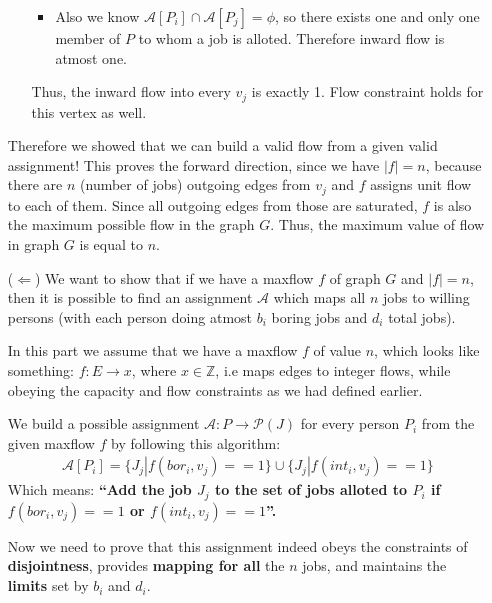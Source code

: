 \documentclass[11pt, fleqn]{article}
\begin{document}
\begin{itemize}
\begin{itemize}
\begin{itemize}
            \item Also we know $\mathcal{A}[P_i] \cap \mathcal{A}[P_j] = \phi$, so there exists one and only one member of $P$ to whom a job is alloted. Therefore inward flow is atmost one.
        \end{itemize}
        Thus, the inward flow into every $v_j$ is exactly 1. Flow constraint holds for this vertex as well.
    \end{itemize}
    
    Therefore we showed that we can build a valid flow from a given valid assignment! This proves the forward direction, since we have $|f|=n$, because there are $n$ (number of jobs) outgoing edges from $v_j$ and $f$ assigns unit flow to each of them. Since all outgoing edges from those are saturated, $f$ is also the maximum possible flow in the graph $G$. Thus, the maximum value of flow in graph $G$ is equal to $n$.
    
    \item[($\Leftarrow$)] We want to show that if we have a maxflow $f$ of graph $G$ and $|f|=n$, then it is possible to find an assignment $\mathcal{A}$ which maps all $n$ jobs to willing persons (with each person doing atmost $b_i$ boring jobs and $d_i$ total jobs).
    
    In this part we assume that we have a maxflow $f$ of value $n$, which looks like something: $f: E \longrightarrow x$, where $x \in \mathbb{Z}$, i.e maps edges to integer flows, while obeying the capacity and flow constraints as we had defined earlier.
    
    We build a possible assignment $\mathcal{A}: P \longrightarrow \mathcal{P}(J)$ for every person $P_i$ from the given maxflow $f$ by following this algorithm:
    \begin{equation*}
        \begin{gathered}
            \mathcal{A}[P_i] = \{J_j | f(bor_i,v_j) == 1 \} \cup \{J_j | f(int_i,v_j) == 1 \}
        \end{gathered}
    \end{equation*}
    Which means: \textbf{``Add the job $J_j$ to the set of jobs alloted to $P_i$ if $f(bor_i,v_j)==1$ or $f(int_i,v_j)==1$''.}
    
    
    Now we need to prove that this assignment indeed obeys the constraints of \textbf{disjointness}, provides \textbf{mapping for all} the $n$ jobs, and maintains the \textbf{limits} set by $b_i$ and $d_i$.
    

\end{itemize}
\end{document}
